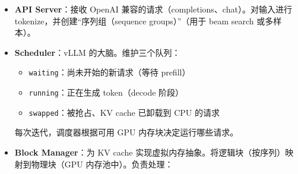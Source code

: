 \begin{itemize}
  \item \textbf{API Server}：接收 OpenAI 兼容的请求（completions、chat）。对输入进行 tokenize，并创建“序列组（sequence groups）”（用于 beam search 或多样本）。
  \item \textbf{Scheduler}：vLLM 的大脑。维护三个队列：

\begin{itemize}
  \item \texttt{waiting}：尚未开始的新请求（等待 prefill）
  \item \texttt{running}：正在生成 token（decode 阶段）
  \item \texttt{swapped}：被抢占、KV cache 已卸载到 CPU 的请求
\end{itemize}

每次迭代，调度器根据可用 GPU 内存块决定运行哪些请求。
  \item \textbf{Block Manager}：为 KV cache 实现虚拟内存抽象。将逻辑块（按序列）映射到物理块（GPU 内存池中）。负责处理：


\end{itemize}
